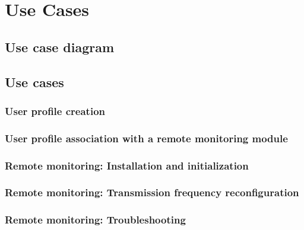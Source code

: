 \chapter{Use Cases}
\label{use-cases}

\section{Use case diagram}

\begin{figure}
	\begin{centering}
		\label{use-case-diagram}
	\end{centering}
\end{figure}

\section{Use cases}

\subsection{User profile creation}
\label{uc-user-profile-creation}


\subsection{User profile association with a remote monitoring module}
\label{uc-user-profile-association}


\subsection{Remote monitoring: Installation and initialization}
\label{uc-remote-monitoring-installation}


\subsection{Remote monitoring: Transmission frequency reconfiguration}
\label{uc-remote-monitoring-frequency-reconfiguration}


\subsection{Remote monitoring: Troubleshooting}
\label{uc-remote-monitoring-troubleshooting}


